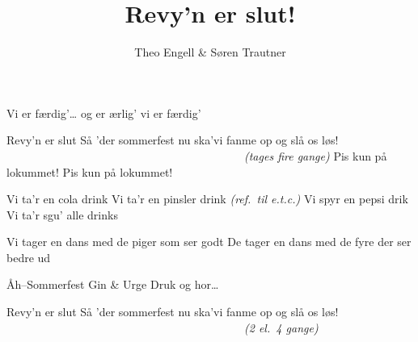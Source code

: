 \documentclass[danish]{article}
\title{Revy'n er slut!}
\author{Theo Engell \& Søren Trautner}
\begin{document}
\maketitle



\begin{song}

 Vi er færdig'\ldots
            og er ærlig'
            vi er færdig'

 Revy'n er slut
               Så 'der sommerfest
               nu ska'vi fanme op og slå os løs!
{~~~~~~~~~~~~~~~~~~~~~~~~~~~~~~~~~~~~~~~~~~\em (tages fire gange)}
Pis kun på lokummet!
Pis kun på lokummet!

 Vi ta'r en cola drink
                  Vi ta'r en pinsler drink {\em (ref.\ til e.t.c.)}
                  Vi spyr en pepsi drik
                  Vi ta'r sgu' alle drinks

                  Vi tager en dans med de piger
                  som ser godt
                  De tager en dans med de fyre 
                  der ser bedre ud


 Åh--Sommerfest
            Gin \& Urge
            Druk og hor\ldots
                          
 Revy'n er slut
               Så 'der sommerfest
               nu ska'vi fanme op og slå os løs! 
{~~~~~~~~~~~~~~~~~~~~~~~~~~~~~~~~~~~~~~~~~~\em (2 el.\ 4 gange)}


\end{song}
\end{document}
